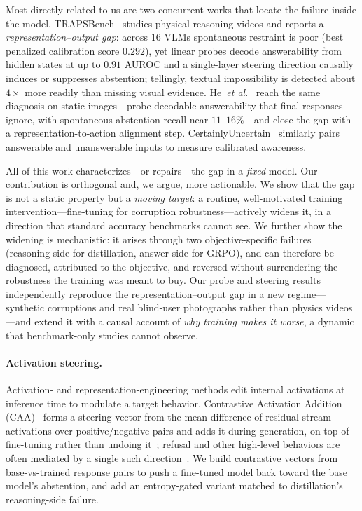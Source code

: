 \documentclass[10pt,twocolumn,letterpaper]{article}
\makeatletter
\providecommand{\etal}{\textit{et al}.\@\xspace}
\makeatother
\begin{document}
Most directly related to us are two concurrent works that locate the failure inside the
model. TRAPSBench~\cite{pramono2026trapsbench} studies physical-reasoning videos and
reports a \emph{representation--output gap}: across $16$ VLMs spontaneous restraint is
poor (best penalized calibration score $0.292$), yet linear probes decode answerability
from hidden states at up to $0.91$ AUROC and a single-layer steering direction causally
induces or suppresses abstention; tellingly, textual impossibility is detected about
$4\times$ more readily than missing visual evidence. He~\etal~\cite{he2026knowing} reach
the same diagnosis on static images---probe-decodable answerability that final responses
ignore, with spontaneous abstention recall near $11$--$16\%$---and close the gap with a
representation-to-action alignment step. CertainlyUncertain~\cite{chandu2025certainly}
similarly pairs answerable and unanswerable inputs to measure calibrated awareness.

All of this work characterizes---or repairs---the gap in a \emph{fixed} model. Our
contribution is orthogonal and, we argue, more actionable. We show that the gap is not a
static property but a \emph{moving target}: a routine, well-motivated training
intervention---fine-tuning for corruption robustness---actively widens it, in a direction
that standard accuracy benchmarks cannot see. We further show the widening is
mechanistic: it arises through two objective-specific failures (reasoning-side for
distillation, answer-side for GRPO), and can therefore be diagnosed, attributed to the
objective, and reversed without surrendering the robustness the training was meant to buy.
Our probe and steering results independently reproduce the representation--output gap in a
new regime---synthetic corruptions and real blind-user photographs rather than physics
videos---and extend it with a causal account of \emph{why training makes it worse}, a
dynamic that benchmark-only studies cannot observe.

\paragraph{Activation steering.}
Activation- and representation-engineering methods edit internal activations at inference
time to modulate a target behavior. Contrastive Activation Addition
(CAA)~\cite{rimsky2024caa} forms a steering vector from the mean difference of
residual-stream activations over positive/negative pairs and adds it during generation,
on top of fine-tuning rather than undoing it~\cite{turner2023actadd,li2023iti}; refusal
and other high-level behaviors are often mediated by a single such
direction~\cite{arditi2024refusal}. We build contrastive vectors from base-vs-trained
response pairs to push a fine-tuned model back toward the base model's abstention, and add
an entropy-gated variant matched to distillation's reasoning-side failure.
\end{document}
